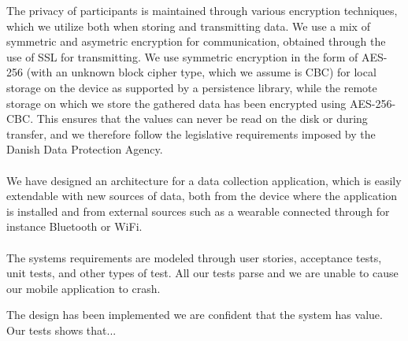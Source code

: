 The privacy of participants is maintained through various encryption techniques, which we utilize both when storing and transmitting data. We use a mix of symmetric and asymetric encryption for communication, obtained through the use of SSL for transmitting. We use symmetric encryption in the form of AES-256 (with an unknown block cipher type, which we assume is CBC) for local storage on the device as supported by a persistence library, while the remote storage on which we store the gathered data has been encrypted using AES-256-CBC. This ensures that the values can never be read on the disk or during transfer, and we therefore follow the legislative requirements imposed by the Danish Data Protection Agency. 
\\\\
We have designed an architecture for a data collection application, which is easily extendable with new sources of data, both from the device where the application is installed and from external sources such as a wearable connected through for instance Bluetooth or WiFi.
\\\\


The systems requirements are modeled through user stories, acceptance tests, unit tests, and other types of test. All our tests parse and we are unable to cause our mobile application to crash. 


The design has been implemented we are confident that the system has value. Our tests shows that... 




